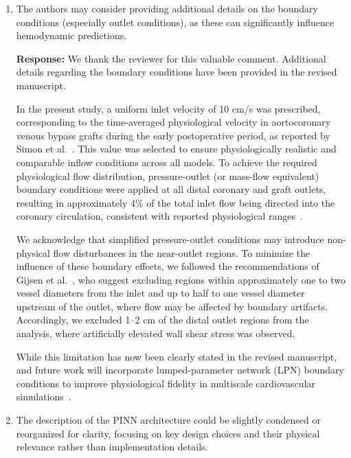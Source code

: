 \documentclass[11pt]{article}
\begin{document}
\begin{enumerate}[]
    \textbf{Response:} The Newtonian-versus-Carreau--Yasuda discussion has been streamlined: the redundant per-patient narration of the same qualitative trends has been condensed and replaced by a compact summary that reports the trends once and refers to the per-patient tables for the quantitative detail, removing the repetition the reviewer noted.

    \item The authors may consider providing additional details on the boundary conditions (especially outlet conditions), as these can significantly influence hemodynamic predictions.

    \textbf{Response:} We thank the reviewer for this valuable comment. Additional details regarding the boundary conditions have been provided in the revised manuscript.

In the present study, a uniform inlet velocity of 10 cm/s was prescribed, corresponding to the time-averaged physiological velocity in aortocoronary venous bypass grafts during the early postoperative period, as reported by Simon et al.~\cite{Simon1982}. This value was selected to ensure physiologically realistic and comparable inflow conditions across all models. To achieve the required physiological flow distribution, pressure-outlet (or mass-flow equivalent) boundary conditions were applied at all distal coronary and graft outlets, resulting in approximately 4\% of the total inlet flow being directed into the coronary circulation, consistent with reported physiological ranges~\cite{Khan2020}.

We acknowledge that simplified pressure-outlet conditions may introduce non-physical flow disturbances in the near-outlet regions. To minimize the influence of these boundary effects, we followed the recommendations of Gijsen et al.~\cite{Gijsen2019}, who suggest excluding regions within approximately one to two vessel diameters from the inlet and up to half to one vessel diameter upstream of the outlet, where flow may be affected by boundary artifacts. Accordingly, we excluded 1–2 cm of the distal outlet regions from the analysis, where artificially elevated wall shear stress was observed.

While this limitation has now been clearly stated in the revised manuscript, and future work will incorporate lumped-parameter network (LPN) boundary conditions to improve physiological fidelity in multiscale cardiovascular simulations~\cite{Sankaran2012,Khan2020}.

    \item The description of the PINN architecture could be slightly condensed or reorganized for clarity, focusing on key design choices and their physical relevance rather than implementation details.


\end{enumerate}
\end{document}
